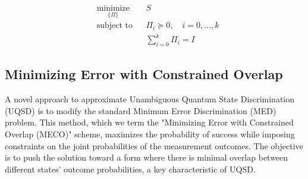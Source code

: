 \begin{align}
     & \underset{\{\Pi\}}{\text{minimize}} &  & S                                         \\
     & \text{subject to}                   &  & \Pi_{i} \succeq 0, \quad i = 0, \ldots, k \\
     &                                     &  & \sum_{i=0}^{k} \Pi_i = I
\end{align}

\subsection{Minimizing Error with Constrained Overlap}
\label{sec:maxpsucc_mindiff}

A novel approach to approximate Unambiguous Quantum State Discrimination (UQSD)
is to modify the standard Minimum Error Discrimination (MED) problem.
This method, which we term the "Minimizing Error with Constrained Overlap (MECO)"
scheme, maximizes the probability of success while imposing constraints on the
joint probabilities of the measurement outcomes.
The objective is to push the solution toward a form where there is minimal
overlap between different states' outcome probabilities, a key characteristic of UQSD.

